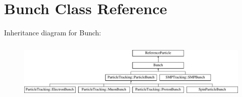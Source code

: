 \hypertarget{classBunch}{}\section{Bunch Class Reference}
\label{classBunch}
Inheritance diagram for Bunch\+:\begin{figure}[H]
\begin{center}
\leavevmode
\includegraphics[height=2.786070cm]{classBunch}
\end{center}
\end{figure}
